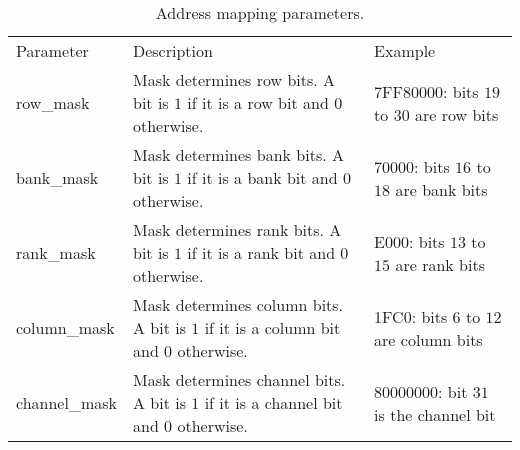\begin{table*}[ht] 
\scriptsize
\centering
\caption{Address mapping parameters.}
\begin{tabular}{|l|p{9cm}|p{5cm}|}
  \hline
   Parameter & Description & Example\\
   
   row\_mask & Mask determines row bits. A bit is $1$ if it is a row bit and $0$ otherwise. & 7FF80000: bits $19$ to $30$ are row bits\\
   
\hline

  bank\_mask & Mask determines bank bits. A bit is $1$ if it is a bank bit and $0$ otherwise. & 70000: bits $16$ to $18$ are bank bits\\
   
\hline

  rank\_mask & Mask determines rank bits. A bit is $1$ if it is a rank bit and $0$ otherwise. & E000: bits $13$ to $15$ are rank bits\\
   
\hline

  column\_mask & Mask determines column bits. A bit is $1$ if it is a column bit and $0$ otherwise. & 1FC0: bits $6$ to $12$ are column bits\\
   
\hline

 channel\_mask & Mask determines channel bits. A bit is $1$ if it is a channel bit and $0$ otherwise. & 80000000: bit $31$ is the channel bit\\
   
\hline

\end{tabular}
\label{tb:vars}
\end{table*}